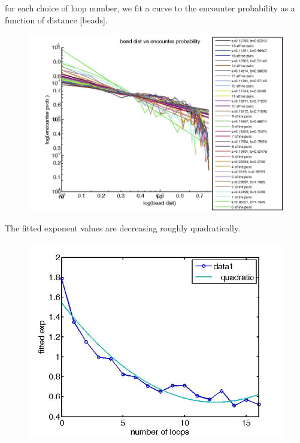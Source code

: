 \documentclass[12pt]{book}
\begin{document}
for each choice of loop number, we fit a curve to the encounter probability as a function of distance [beads].
\begin{figure}[H]
\includegraphics[scale=0.3]{logBeadDistanceVsEncounterProbabilityVariableLoops32Beads}
\label{figure_logBeadDistanceVsEncounterProbabilityVariableLoops32Bead}
\end{figure}

The fitted exponent values are decreasing roughly quadratically. 
\begin{figure}[H]
\includegraphics[scale=0.3]{changeOfExponentAsAfunctionOfLoopsStableLoopModelVariableLoops32Beads}
\label{figure_changeOfExponentAsAfunctionOfLoopsStableLoopModelVariableLoops32Beads}
\end{figure}
	
\end{document}
